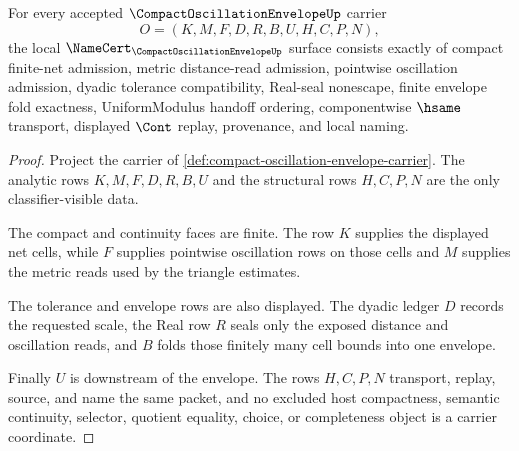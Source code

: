\begin{theorem}
\label{thm:compact-oscillation-envelope-namecert-obligations}
For every accepted $\CompactOscillationEnvelopeUp$ carrier
$$
O=(K,M,F,D,R,B,U,H,C,P,N),
$$
the local $\NameCert_{\CompactOscillationEnvelopeUp}$ surface consists exactly of compact finite-net admission, metric distance-read admission, pointwise oscillation admission, dyadic tolerance compatibility, Real-seal nonescape, finite envelope fold exactness, UniformModulus handoff ordering, componentwise $\hsame$ transport, displayed $\Cont$ replay, provenance, and local naming.
\end{theorem}
\begin{proof}
Project the carrier of \autoref{def:compact-oscillation-envelope-carrier}. The analytic rows $K,M,F,D,R,B,U$ and the structural rows $H,C,P,N$ are the only classifier-visible data.

The compact and continuity faces are finite. The row $K$ supplies the displayed net cells, while $F$ supplies pointwise oscillation rows on those cells and $M$ supplies the metric reads used by the triangle estimates.

The tolerance and envelope rows are also displayed. The dyadic ledger $D$ records the requested scale, the Real row $R$ seals only the exposed distance and oscillation reads, and $B$ folds those finitely many cell bounds into one envelope.

Finally $U$ is downstream of the envelope. The rows $H,C,P,N$ transport, replay, source, and name the same packet, and no excluded host compactness, semantic continuity, selector, quotient equality, choice, or completeness object is a carrier coordinate.
\end{proof}

